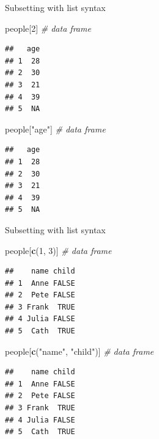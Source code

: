 \documentclass[ignorenonframetext,]{beamer}
\newenvironment{Shaded}{\begin{snugshade}}{\end{snugshade}}
\newcommand{\CommentTok}[1]{\textcolor[rgb]{0.56,0.35,0.01}{\textit{#1}}}
\newcommand{\DecValTok}[1]{\textcolor[rgb]{0.00,0.00,0.81}{#1}}
\newcommand{\KeywordTok}[1]{\textcolor[rgb]{0.13,0.29,0.53}{\textbf{#1}}}
\newcommand{\NormalTok}[1]{#1}
\newcommand{\StringTok}[1]{\textcolor[rgb]{0.31,0.60,0.02}{#1}}
\begin{document}
\begin{frame}[fragile]{Subsetting with list syntax}
\protect\hypertarget{subsetting-with-list-syntax-1}{}

\begin{Shaded}
\begin{Highlighting}[]
\NormalTok{people[}\DecValTok{2}\NormalTok{] }\CommentTok{# data frame}
\end{Highlighting}
\end{Shaded}

\begin{verbatim}
##   age
## 1  28
## 2  30
## 3  21
## 4  39
## 5  NA
\end{verbatim}

\begin{Shaded}
\begin{Highlighting}[]
\NormalTok{people[}\StringTok{"age"}\NormalTok{] }\CommentTok{# data frame}
\end{Highlighting}
\end{Shaded}

\begin{verbatim}
##   age
## 1  28
## 2  30
## 3  21
## 4  39
## 5  NA
\end{verbatim}

\end{frame}

\begin{frame}[fragile]{Subsetting with list syntax}
\protect\hypertarget{subsetting-with-list-syntax-2}{}

\begin{Shaded}
\begin{Highlighting}[]
\NormalTok{people[}\KeywordTok{c}\NormalTok{(}\DecValTok{1}\NormalTok{, }\DecValTok{3}\NormalTok{)] }\CommentTok{# data frame}
\end{Highlighting}
\end{Shaded}

\begin{verbatim}
##    name child
## 1  Anne FALSE
## 2  Pete FALSE
## 3 Frank  TRUE
## 4 Julia FALSE
## 5  Cath  TRUE
\end{verbatim}

\begin{Shaded}
\begin{Highlighting}[]
\NormalTok{people[}\KeywordTok{c}\NormalTok{(}\StringTok{"name"}\NormalTok{, }\StringTok{"child"}\NormalTok{)] }\CommentTok{# data frame}
\end{Highlighting}
\end{Shaded}

\begin{verbatim}
##    name child
## 1  Anne FALSE
## 2  Pete FALSE
## 3 Frank  TRUE
## 4 Julia FALSE
## 5  Cath  TRUE
\end{verbatim}

\end{frame}
\end{document}
